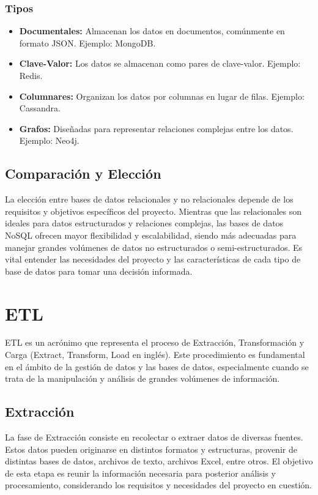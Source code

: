 \subsubsection{Tipos}
\begin{itemize}
\item \textbf{Documentales:} Almacenan los datos en documentos, comúnmente en formato JSON. Ejemplo: MongoDB.
\item \textbf{Clave-Valor:} Los datos se almacenan como pares de clave-valor. Ejemplo: Redis.
\item \textbf{Columnares:} Organizan los datos por columnas en lugar de filas. Ejemplo: Cassandra.
\item \textbf{Grafos:} Diseñadas para representar relaciones complejas entre los datos. Ejemplo: Neo4j.
\end{itemize}

\subsection{Comparación y Elección}

La elección entre bases de datos relacionales y no relacionales depende de los requisitos y objetivos específicos del proyecto. Mientras que las relacionales son ideales para datos estructurados y relaciones complejas, las bases de datos NoSQL ofrecen mayor flexibilidad y escalabilidad, siendo más adecuadas para manejar grandes volúmenes de datos no estructurados o semi-estructurados. Es vital entender las necesidades del proyecto y las características de cada tipo de base de datos para tomar una decisión informada.

\section{ETL}

ETL es un acrónimo que representa el proceso de Extracción, Transformación y Carga (Extract, Transform, Load en inglés). Este procedimiento es fundamental en el ámbito de la gestión de datos y las bases de datos, especialmente cuando se trata de la manipulación y análisis de grandes volúmenes de información.

\subsection{Extracción}

La fase de Extracción consiste en recolectar o extraer datos de diversas fuentes. Estos datos pueden originarse en distintos formatos y estructuras, provenir de distintas bases de datos, archivos de texto, archivos Excel, entre otros. El objetivo de esta etapa es reunir la información necesaria para posterior análisis y procesamiento, considerando los requisitos y necesidades del proyecto en cuestión.

